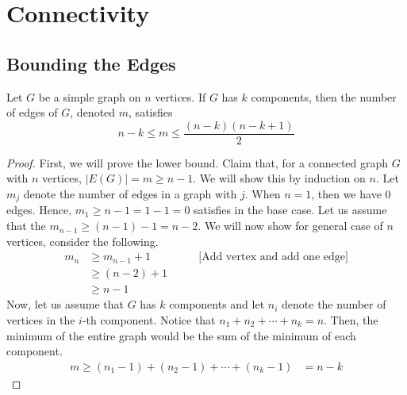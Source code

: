 \section{Connectivity}

\subsection{Bounding the Edges}

\begin{theorem}\label{thm:graph-edge-bounds}
  Let \(G\) be a simple graph on \(n\) vertices. If \(G\) has \(k\) components,
  then the number of edges of \(G\), denoted \(m\), satisfies
  \[ n-k \leq m \leq \frac{(n-k)(n-k+1)}{2} \]
\end{theorem}

\begin{proof}
  First, we will prove the lower bound. Claim that, for a connected graph \(G\)
  with \(n\) vertices, \(|E(G)| = m \geq n-1\). We will show this by induction on \(n\).
  Let \(m_j\) denote the number of edges in a graph with \(j\). When 
  \(n = 1\), then we have 0 edges. Hence, \(m_1 \geq n-1 = 1 - 1 = 0\) satisfies
  in the base case. Let us assume that the \(m_{n-1} \geq (n-1) - 1 = n-2\). We
  will now show for general case of \(n\) vertices, consider the following.
  \[
  \begin{aligned}
    m_n & \geq m_{n-1} + 1 & \qquad\text{[Add vertex and add one edge]} \\ 
        & \geq (n - 2) + 1 \\ 
        & \geq n - 1
  \end{aligned}
  \]
  Now, let us assume that \(G\) has \(k\) components and let \(n_i\) denote the
  number of vertices in the \(i\)-th component. Notice that \(n_1 + n_2 + \cdots
  + n_k = n\). Then, the minimum of the entire graph would be the sum of the
  minimum of each component.
  \[
  \begin{aligned}
    m \geq (n_1 - 1) + (n_2 - 1) + \cdots + (n_k - 1) &= n-k
  \end{aligned}
  \]


\end{proof}
